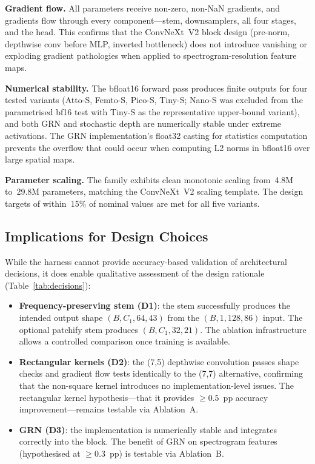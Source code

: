\documentclass{article}
\begin{document}
\textbf{Gradient flow.} All parameters receive non-zero, non-NaN gradients, and
gradients flow through every component---stem, downsamplers, all four stages, and
the head. This confirms that the ConvNeXt~V2 block design (pre-norm, depthwise
conv before MLP, inverted bottleneck) does not introduce vanishing or exploding
gradient pathologies when applied to spectrogram-resolution feature maps.

\textbf{Numerical stability.} The bfloat16 forward pass produces finite outputs
for four tested variants (Atto-S, Femto-S, Pico-S, Tiny-S; Nano-S was excluded
from the parametrised bf16 test with Tiny-S as the representative upper-bound
variant), and both GRN and stochastic depth are numerically stable under
extreme activations. The GRN implementation's float32 casting for statistics
computation prevents the overflow that could occur when computing L2 norms in
bfloat16 over large spatial maps.

\textbf{Parameter scaling.} The family exhibits clean monotonic scaling from~4.8M
to~29.8M parameters, matching the ConvNeXt~V2 scaling template. The design
targets of within~15\% of nominal values are met for all five variants.

\subsection{Implications for Design Choices}

While the harness cannot provide accuracy-based validation of architectural
decisions, it does enable qualitative assessment of the design rationale
(Table~\ref{tab:decisions}):

\begin{itemize}
  \item \textbf{Frequency-preserving stem (D1)}: the stem successfully produces
  the intended output shape $(B, C_1, 64, 43)$ from the $(B, 1, 128, 86)$ input.
  The optional patchify stem produces $(B, C_1, 32, 21)$. The ablation
  infrastructure allows a controlled comparison once training is available.
  \item \textbf{Rectangular kernels (D2)}: the (7,5) depthwise convolution
  passes shape checks and gradient flow tests identically to the (7,7)
  alternative, confirming that the non-square kernel introduces no
  implementation-level issues. The rectangular kernel hypothesis---that it
  provides $\geq 0.5$~pp accuracy improvement---remains testable via Ablation~A.
  \item \textbf{GRN (D3)}: the implementation is numerically stable and
  integrates correctly into the block. The benefit of GRN on spectrogram
  features (hypothesised at $\geq 0.3$~pp) is testable via Ablation~B.
\end{itemize}
\end{document}
